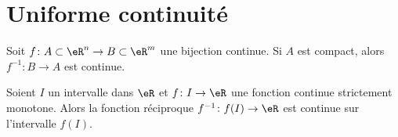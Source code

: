 					\section{Uniforme continuité}

\begin{proposition}	\label{PropoInvCompCont}
Soit $f\colon A\subset\eR^n\to B\subset\eR^m$ une bijection continue. Si $A$ est compact, alors $f^{-1}\colon B\to A$ est continue.
\end{proposition}

\begin{proposition}		\label{PropIntContMOnIvCont}
Soient $I$ un intervalle dans $\eR$ et $f\colon I\to \eR$ une fonction continue strictement monotone. Alors la fonction réciproque $f^{-1}\colon f(I)\to \eR$ est continue sur l'intervalle $f(I)$.
\end{proposition}


